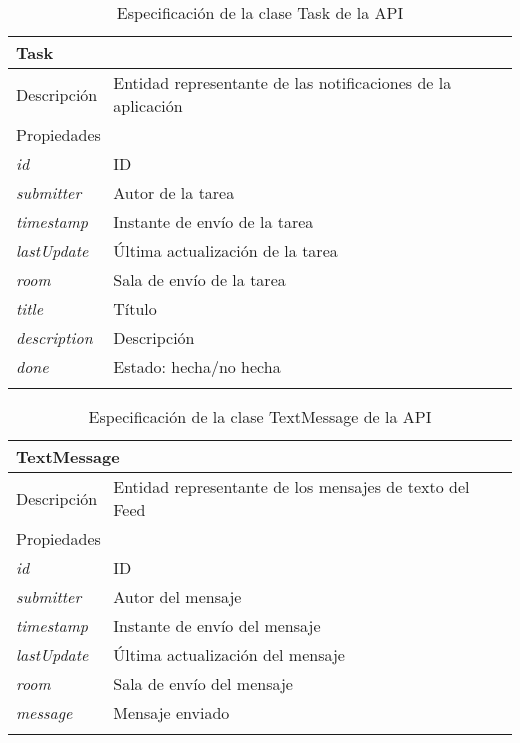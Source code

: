 \begin{longtable}{|p{} p{}|}
    \hline
    \multicolumn{2}{|l|}{Task} \\ \hline \hline
    Descripción      & Entidad representante de las notificaciones de la aplicación \\ \hline
    \multicolumn{2}{|l|}{Propiedades} \\
    \emph{id}  & ID  \\
    \emph{submitter}  & Autor de la tarea  \\
    \emph{timestamp}  & Instante de envío de la tarea \\
    \emph{lastUpdate}  & Última actualización de la tarea  \\
    \emph{room}  & Sala de envío de la tarea  \\
    \emph{title}  & Título  \\
    \emph{description}  & Descripción  \\
    \emph{done}  & Estado: hecha/no hecha  \\ \hline
    \caption{Especificación de la clase Task de la API}
    \label{class:api:task}
\end{longtable}

\newpage
\begin{longtable}{|p{} p{}|}
    \hline
    \multicolumn{2}{|l|}{TextMessage} \\ \hline \hline
    Descripción      & Entidad representante de los mensajes de texto del Feed \\ \hline
    \multicolumn{2}{|l|}{Propiedades} \\
    \emph{id}  & ID  \\
    \emph{submitter}  & Autor del mensaje  \\
    \emph{timestamp}  & Instante de envío del mensaje \\
    \emph{lastUpdate}  & Última actualización del mensaje  \\
    \emph{room}  & Sala de envío del mensaje  \\
    \emph{message}  & Mensaje enviado  \\ \hline
    \caption{Especificación de la clase TextMessage de la API}
    \label{class:api:text_message}
\end{longtable}

